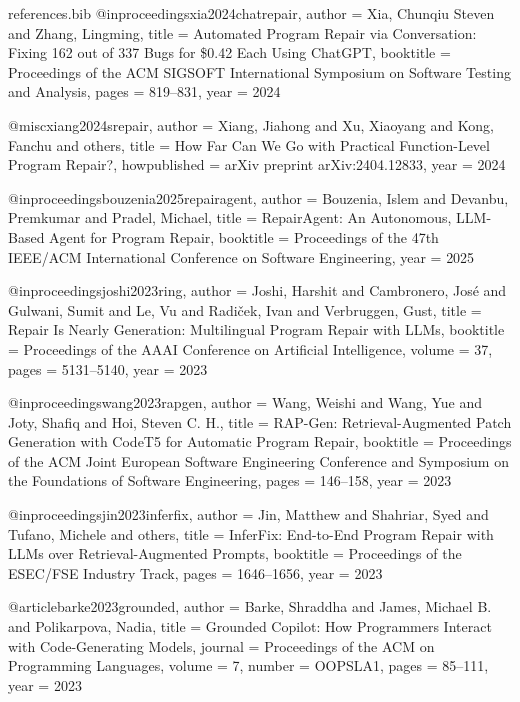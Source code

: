 \begin{filecontents*}[overwrite]{references.bib}
@inproceedings{xia2024chatrepair,
  author    = {Xia, Chunqiu Steven and Zhang, Lingming},
  title     = {Automated Program Repair via Conversation: Fixing 162 out of 337 Bugs for \$0.42 Each Using ChatGPT},
  booktitle = {Proceedings of the ACM SIGSOFT International Symposium on Software Testing and Analysis},
  pages     = {819--831},
  year      = {2024}
}

@misc{xiang2024srepair,
  author       = {Xiang, Jiahong and Xu, Xiaoyang and Kong, Fanchu and others},
  title        = {How Far Can We Go with Practical Function-Level Program Repair?},
  howpublished = {arXiv preprint arXiv:2404.12833},
  year         = {2024}
}

@inproceedings{bouzenia2025repairagent,
  author    = {Bouzenia, Islem and Devanbu, Premkumar and Pradel, Michael},
  title     = {RepairAgent: An Autonomous, LLM-Based Agent for Program Repair},
  booktitle = {Proceedings of the 47th IEEE/ACM International Conference on Software Engineering},
  year      = {2025}
}

@inproceedings{joshi2023ring,
  author    = {Joshi, Harshit and Cambronero, Jos{\'e} and Gulwani, Sumit and Le, Vu and Radi{\v{c}}ek, Ivan and Verbruggen, Gust},
  title     = {Repair Is Nearly Generation: Multilingual Program Repair with LLMs},
  booktitle = {Proceedings of the AAAI Conference on Artificial Intelligence},
  volume    = {37},
  pages     = {5131--5140},
  year      = {2023}
}

@inproceedings{wang2023rapgen,
  author    = {Wang, Weishi and Wang, Yue and Joty, Shafiq and Hoi, Steven C. H.},
  title     = {RAP-Gen: Retrieval-Augmented Patch Generation with CodeT5 for Automatic Program Repair},
  booktitle = {Proceedings of the ACM Joint European Software Engineering Conference and Symposium on the Foundations of Software Engineering},
  pages     = {146--158},
  year      = {2023}
}

@inproceedings{jin2023inferfix,
  author    = {Jin, Matthew and Shahriar, Syed and Tufano, Michele and others},
  title     = {InferFix: End-to-End Program Repair with LLMs over Retrieval-Augmented Prompts},
  booktitle = {Proceedings of the ESEC/FSE Industry Track},
  pages     = {1646--1656},
  year      = {2023}
}

@article{barke2023grounded,
  author  = {Barke, Shraddha and James, Michael B. and Polikarpova, Nadia},
  title   = {Grounded Copilot: How Programmers Interact with Code-Generating Models},
  journal = {Proceedings of the ACM on Programming Languages},
  volume  = {7},
  number  = {OOPSLA1},
  pages   = {85--111},
  year    = {2023}
}


\end{filecontents*}
